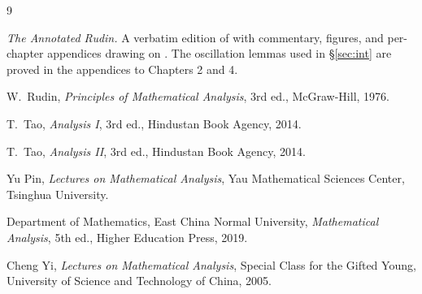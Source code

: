 \begin{thebibliography}{9}

\emph{The Annotated Rudin.} A verbatim edition of \cite{rudin} with
commentary, figures, and per-chapter appendices drawing on
\cite{taoI,taoII,yupin,ecnu,ustc}. The oscillation lemmas used in
\S\ref{sec:int} are proved in the appendices to Chapters 2 and 4.

W.~Rudin, \emph{Principles of Mathematical Analysis}, 3rd ed.,
McGraw-Hill, 1976.

T.~Tao, \emph{Analysis I}, 3rd ed., Hindustan Book Agency, 2014.

T.~Tao, \emph{Analysis II}, 3rd ed., Hindustan Book Agency, 2014.

Yu Pin, \emph{Lectures on Mathematical Analysis}, Yau Mathematical Sciences
Center, Tsinghua University.

Department of Mathematics, East China Normal University,
\emph{Mathematical Analysis}, 5th ed., Higher Education Press, 2019.

Cheng Yi, \emph{Lectures on Mathematical Analysis}, Special Class for the
Gifted Young, University of Science and Technology of China, 2005.

\end{thebibliography}
